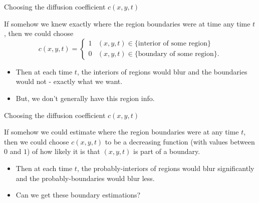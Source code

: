\documentclass{beamer}
\begin{document}
\begin{frame}{Choosing the diffusion coefficient $c(x,y,t)$}
    
    \begin{block}{}
        If somehow we knew exactly where the region boundaries were at time any time $t$, then we could choose
            \begin{equation*}
                c(x,y,t)=\begin{cases}
                    1 & (x,y,t)\in\{\text{interior of some region}\}\\
                    0 & (x,y,t)\in\{\text{boundary of some region}\}.
                \end{cases}
            \end{equation*}
    \end{block}
    
    \begin{block}{}
        \begin{itemize}
            \item Then at each time $t$, the interiors of regions would blur and the boundaries would not - exactly what we want.
            \item But, we don't generally have this region info. 
        \end{itemize}
    \end{block}

\end{frame}

\begin{frame}{Choosing the diffusion coefficient $c(x,y,t)$}
    
    \begin{block}{}
        If somehow we could estimate where the region boundaries were at any time $t$, then we could choose  $c(x,y,t)$ to be a decreasing function (with values between $0$ and $1$) of how likely it is that $(x,y,t)$ is part of a boundary.
    \end{block}
    
    \begin{block}{}
        \begin{itemize}
            \item Then at each time $t$, the probably-interiors of regions would blur significantly and the probably-boundaries would blur less.
            \item Can we get these  boundary estimations? 
        \end{itemize}
    \end{block}

\end{frame}
\end{document}
